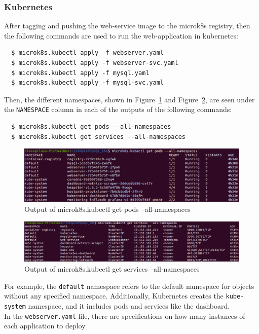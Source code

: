 \documentclass[11pt]{article}
\begin{document}
\subsubsection*{Kubernetes}
After tagging and pushing the web-service image to the microk8s registry, then the following commands are used to run the
web-application in kubernetes:
\begin{verbatim}
  $ microk8s.kubectl apply -f webserver.yaml
  $ microk8s.kubectl apply -f webserver-svc.yaml
  $ microk8s.kubectl apply -f mysql.yaml
  $ microk8s.kubectl apply -f mysql-svc.yaml
\end{verbatim}
Then, the different namespaces, shown in Figure~\ref{fig:pods} and Figure~\ref{fig:svcs}, are seen under the
\verb|NAMESPACE| column in each of the outputs of the following commands:
\begin{verbatim}
  $ microk8s.kubectl get pods --all-namespaces
  $ microk8s.kubectl get services --all-namespaces
\end{verbatim}
\begin{figure}[htbp]
  \centering
  \includegraphics[width=1\linewidth]{./get_pods_1.png}
  \caption{\label{fig:pods}
  Output of microk8s.kubectl get pods --all-namespaces}
\end{figure}
\begin{figure}[htbp]
  \centering
  \includegraphics[width=1\linewidth]{./get_services_1.png}
  \caption{\label{fig:svcs}
  Output of microk8s.kubectl get services --all-namespaces}
\end{figure}
For example, the \verb|default| namespace refers to the default namespace for objects without any specified
namespace. Additionally, Kubernetes creates the \verb|kube-system| namespace, and it includes pods and services
like the dashboard.~\cite{namespace}\\
In the \verb|webserver.yaml| file, there are specifications on how many instances of each application to deploy
\end{document}
